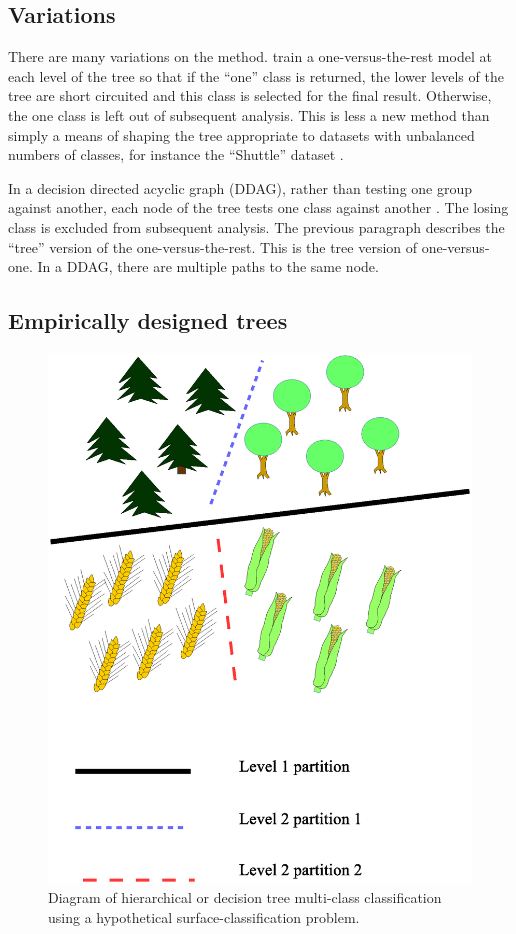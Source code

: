 \subsection{Variations}

There are many variations on the method. \citet{Ramanan_etal2007} train a 
one-versus-the-rest model at each level of the tree so that if the ``one''
class is returned, the lower levels of the tree are short circuited
and this class is selected for the final result. Otherwise, the one class
is left out of subsequent analysis. This is less a new method than simply
a means of shaping the tree appropriate to datasets with unbalanced
numbers of classes, for instance the ``Shuttle'' dataset \citep{King_etal1995}.

In a decision directed acyclic graph (DDAG), 
rather than testing one group against another, 
each node of the tree tests one class against another \citep{Platt_etal2000}. 
The losing class is excluded from subsequent analysis. 
The previous paragraph describes the ``tree'' version of the one-versus-the-rest. 
This is the tree version of one-versus-one. 
In a DDAG, there are multiple paths to the same node.

\subsection{Empirically designed trees}

\label{empirical}

\begin{figure}
	\includegraphics[width=1\textwidth]{landclasstree.eps}
	\caption{Diagram of hierarchical or decision tree multi-class classification using a hypothetical surface-classification problem.}
	\label{landclasstree}
\end{figure}

